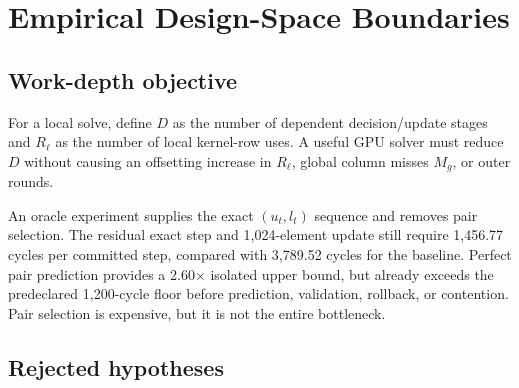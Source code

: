 \section{Empirical Design-Space Boundaries}
\label{sec:boundaries}

\subsection{Work-depth objective}

For a local solve, define $D$ as the number of dependent decision/update
stages and $R_\ell$ as the number of local kernel-row uses. A useful GPU solver
must reduce $D$ without causing an offsetting increase in $R_\ell$, global
column misses $M_g$, or outer rounds.

An oracle experiment supplies the exact $(u_t,l_t)$ sequence and removes pair
selection. The residual exact step and 1,024-element update still require
1,456.77 cycles per committed step, compared with 3,789.52 cycles for the
baseline. Perfect pair prediction provides a 2.60$\times$ isolated upper
bound, but already exceeds the predeclared 1,200-cycle floor before prediction,
validation, rollback, or contention. Pair selection is expensive, but it is
not the entire bottleneck.

\subsection{Rejected hypotheses}

